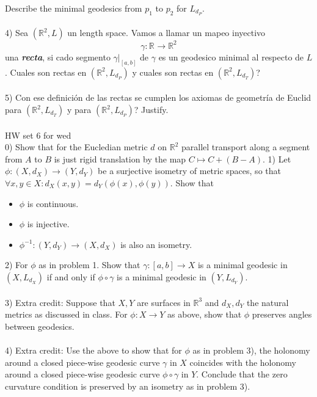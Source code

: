\documentclass{amsart}
\begin{document}
Describe the minimal geodesics from $p _{1}$  to $p _{2}$ for $L _{d _{P}}$. 
\\\\
4) Sea $(\mathbb{R} ^{2}, L) $ un length space. Vamos
a llamar un mapeo inyectivo $$\gamma: \mathbb{R} ^{} \to
\mathbb{R} ^{2} $$ una \textbf{\emph{recta}}, si cado segmento $\gamma | _{[a,b]}$ de $\gamma$ es un geodesico minimal al respecto de $L$. Cuales son rectas en $(\mathbb{R} ^{2}, L _{d _{P}}) $
y cuales son rectas en $(\mathbb{R} ^{2}, L _{d _{T}}) $?
\\\\
5) Con ese definición de las rectas se cumplen los axiomas de geometría de Euclid para $(\mathbb{R} ^{2}, L _{d _{T}}) $ y para $(\mathbb{R} ^{2}, L _{d _{P}}) $? Justify.
\\\\
HW set 6 for wed
\\
0) Show that for the Eucledian metric $d$ on $\mathbb{R} ^{2} $
parallel transport along a segment from $A$ to $B$ is just
rigid translation by the map $C
\mapsto C + (B-A)$.   
1) Let $\phi: (X, d _{X}) \to (Y, d _{Y})$ be a surjective
isometry of metric spaces, so that $\forall x,y \in X:
d _{X} (x, y) = d _{Y} (\phi (x), \phi (y))$. Show that
\begin{itemize}
\item  $\phi $ is continuous.
\item  $\phi $ is injective.
\item $\phi ^{-1}: (Y, d _{Y}) \to (X, d _{X}) $ is also an
isometry.
\end{itemize}
2) For $\phi $ as in problem 1. Show that $\gamma: [a,b] \to
X$ is
a minimal geodesic in $(X, L _{d _{X}})$ if and only if
$\phi \circ \gamma $ is a minimal geodesic in $(Y, L _{d _{Y}})$.
\\\\
3) Extra credit: Suppose that $X,Y$ are surfaces in $\mathbb{R} ^{3} $ and $d _{X},
d _{Y}$ the natural metrics as discussed in class. For
$\phi: X \to Y $ as above, show that $\phi $ preserves angles between geodesics. 
\\\\
4) Extra credit: Use the above to show that for $\phi $ as
in problem 3), 
the holonomy around a closed piece-wise geodesic curve
$\gamma $ in $X$ coincides with the holonomy around a closed
piece-wise geodesic curve $\phi \circ \gamma $ in $Y$.
Conclude that the zero curvature condition is preserved by
an isometry as in problem 3).
\end{document}

